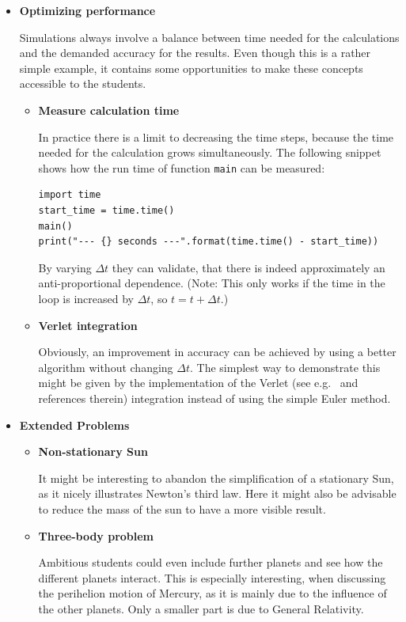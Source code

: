 \documentclass[12pt,ngerman,american]{iopart}
\begin{document}
\begin{itemize}
\item \textbf{Optimizing performance}

Simulations always involve a balance between time needed for the calculations and the demanded accuracy for the results.
Even though this is a rather simple example, it contains some opportunities to make these concepts accessible to the students.

\begin{itemize}
\item \textbf{Measure calculation time}

In practice there is a limit to decreasing the time steps, because the time needed for the calculation grows simultaneously.
The following snippet shows how the run time of function \texttt{main} can be measured:
\begin{lstlisting}
import time
start_time = time.time()
main()
print("--- {} seconds ---".format(time.time() - start_time))
\end{lstlisting}
By varying $\Delta t$ they can validate, that there is indeed approximately an anti-proportional dependence.
(Note: This only works if the time in the loop is increased by $\Delta t$, so $t=t+\Delta t$.)
\item \textbf{Verlet integration}

Obviously, an improvement in accuracy can be achieved by using a better algorithm without changing $\Delta t$.
The simplest way to demonstrate this might be given by the implementation of the Verlet (see e.g.~\cite{Hairer03geometricnumerical} and references therein) integration instead of using the simple Euler method.
\end{itemize}

\item \textbf{Extended Problems}

\begin{itemize}
\item \textbf{Non-stationary Sun}

It might be interesting to abandon the simplification of a stationary Sun, as it nicely illustrates Newton's third law.
Here it might also be advisable to reduce the mass of the sun to have a more visible result.

\item \textbf{Three-body problem}

Ambitious students could even include further planets and see how the different planets interact.
This is especially interesting, when discussing the perihelion motion of Mercury, as it is mainly due to the influence of the other planets.
Only a smaller part is due to General Relativity.

\end{itemize}

\end{itemize}
\end{document}
